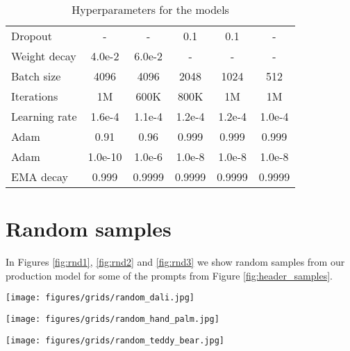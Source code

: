 \documentclass{article}
\newcommand{\modelname}{unCLIP}
\begin{document}
\begin{table}[h]
\begin{center}
\begin{small}
\begin{tabular}{lccccc}
    Dropout              & -         & -       & 0.1     & 0.1     & - \\
    Weight decay         & 4.0e-2    & 6.0e-2  & -       & -       & - \\
    Batch size           & 4096      & 4096    & 2048    & 1024    & 512 \\
    Iterations           & 1M        & 600K    & 800K    & 1M      & 1M \\
    Learning rate        & 1.6e-4    & 1.1e-4  & 1.2e-4  & 1.2e-4  & 1.0e-4 \\
    Adam        & 0.91      & 0.96    & 0.999   & 0.999   & 0.999 \\
    Adam       & 1.0e-10     & 1.0e-6   & 1.0e-8    & 1.0e-8    & 1.0e-8  \\
    EMA decay            & 0.999     & 0.9999  & 0.9999  & 0.9999  & 0.9999 \\
    \bottomrule
    \end{tabular}
    \end{small}
    \end{center}
    \caption{Hyperparameters for the models}
    \label{tab:hps}
    \vskip -0.2in
\end{table}

\clearpage
\section{Random samples}
In Figures \ref{fig:rnd1}, \ref{fig:rnd2} and \ref{fig:rnd3} we show random samples from our production model for some of the prompts from Figure \ref{fig:header_samples}. 

\begin{figure*}[h]
    \begin{center}
    \texttt{[image: figures/grids/random\_dali.jpg]}
    \end{center}
    \caption{Random samples from \modelname{} for prompt ``Vibrant portrait painting of Salvador Dali with a robotic half face''}
    \label{fig:rnd1} 
    \vskip -0.1in
\end{figure*}

\begin{figure*}[h]
    \begin{center}
    \texttt{[image: figures/grids/random\_hand\_palm.jpg]}
    \end{center}
    \caption{Random samples from \modelname{} for prompt ``A close up of a handpalm with leaves growing from it.''}
    \label{fig:rnd2}
    \vskip -0.1in
\end{figure*}

\begin{figure*}[h]
    \begin{center}
        \texttt{[image: figures/grids/random\_teddy\_bear.jpg]}
    \end{center}
    \caption{Random samples from \modelname{} for prompt ``A teddybear on a skateboard in Times Square.''}
    \label{fig:rnd3}
    \vskip -0.1in
\end{figure*}
    
\end{document}
